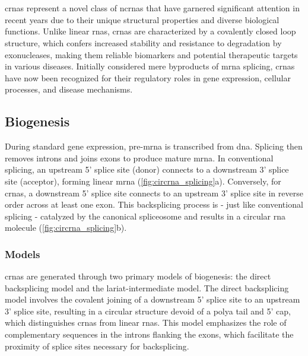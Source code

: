 \section{}
\label{sec:circrnas}

\Glspl{crna} represent a novel class of \glspl{ncrna} that have garnered
significant attention in recent years due to their unique structural properties
and diverse biological functions.
Unlike linear \glspl{rna}, \glspl{crna} are characterized by a covalently
closed loop structure, which confers increased stability and resistance to
degradation by exonucleases, making them reliable biomarkers and potential
therapeutic targets in various
diseases\supercite{ma_circular_2020,hoque_exploring_2023,wilusz_circular_2017}.
Initially considered mere byproducts of \gls{mrna} splicing, \glspl{crna} have
now been recognized for their regulatory roles in gene expression, cellular
processes, and disease
mechanisms\supercite{cherubini_foxp1_2019,wilusz_360_2018}.

\subsection{Biogenesis}
\label{sec:circrna_biogenesis}
During standard gene expression, pre-\gls{mrna} is transcribed from \gls{dna}.
Splicing then removes introns and joins exons to produce mature
\gls{mrna}\supercite{black_mechanisms_2003}.
In conventional splicing, an upstream 5' splice site (donor) connects to a
downstream 3' splice site (acceptor), forming linear \gls{mrna}
(\cref{fig:circrna_splicing}a).
Conversely, for \glspl{crna}, a downstream 5' splice site connects to an
upstream 3' splice site in reverse order across at least one
exon\supercite{chen_expanding_2020}.
This backsplicing process is - just like conventional splicing - catalyzed by
the canonical spliceosome\supercite{starke_exon_2015} and results in a circular
\gls{rna} molecule (\cref{fig:circrna_splicing}b).

\subsubsection{Models}

\glspl{crna} are generated through two primary models of
biogenesis: the direct backsplicing model and the lariat-intermediate model.
The direct backsplicing model involves the covalent joining of a downstream 5'
splice site to an upstream 3' splice site, resulting in a circular structure
devoid of a \gls{polya} tail and 5' cap, which distinguishes \glspl{crna} from
linear \glspl{rna}\supercite{zhang_complementary_2014,ferreira_circular_2018}.
This model emphasizes the role of complementary sequences in the introns
flanking the exons, which facilitate the proximity of splice sites necessary
for backsplicing\supercite{zhang_complementary_2014,meganck_engineering_2021}.

